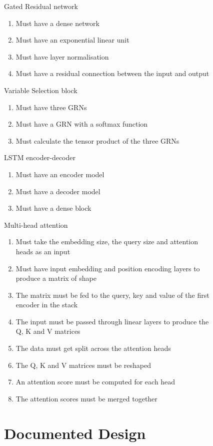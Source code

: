 \documentclass{article}
\begin{document}
\begin{figure}[h!]
Gated Residual network
\begin{enumerate}
    \item Must have a dense network
    \item Must have an exponential linear unit
    \item Must have layer normalisation
    \item Must have a residual connection between the input and output
\end{enumerate}
Variable Selection block
\begin{enumerate}
    \item Must have three GRNs
    \item Must have a GRN with a softmax function
    \item Must calculate the tensor product of the three GRNs
\end{enumerate}
LSTM encoder-decoder
\begin{enumerate}
    \item Must have an encoder model
    \item Must have a decoder model
    \item Must have a dense block
\end{enumerate}
Multi-head attention
\begin{enumerate}
    \item Must take the embedding size, the query size and attention heads as an input
    \item Must have input embedding and position encoding layers to produce a matrix of shape
    \item The matrix must be fed to the query, key and value of the first encoder in the stack
    \item The input must be passed through linear layers to produce the Q, K and V matrices
    \item The data must get split across the attention heads
    \item The Q, K and V matrices must be reshaped
    \item An attention score must be computed for each head
    \item The attention scores must be merged together
\end{enumerate}




\section{Documented Design}


\end{figure}
\end{document}
